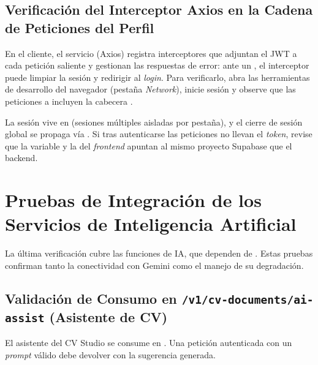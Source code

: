 \subsection[Verificación del Interceptor Axios]{Verificación del Interceptor Axios en la Cadena de Peticiones del Perfil}%
\label{subsec:axios}

En el cliente, el servicio  (Axios) registra interceptores que adjuntan
el JWT a cada petición saliente y gestionan las respuestas de error: ante un ,
el interceptor puede limpiar la sesión y redirigir al \textit{login}. Para verificarlo,
abra las herramientas de desarrollo del navegador (pestaña \textit{Network}), inicie sesión
y observe que las peticiones a  incluyen la cabecera .\par

\begin{NotaConfiguracion}
La sesión vive en  (sesiones múltiples aisladas por pestaña), y el
cierre de sesión global se propaga vía . Si tras autenticarse las
peticiones no llevan el \textit{token}, revise que la variable 
y la  del \textit{frontend} apuntan al mismo proyecto Supabase que el
backend.
\end{NotaConfiguracion}

\section{Pruebas de Integración de los Servicios de Inteligencia Artificial}%
\label{sec:ia}

La última verificación cubre las funciones de IA, que dependen de .
Estas pruebas confirman tanto la conectividad con Gemini como el manejo de su degradación.\par

\subsection[Asistente de CV (ai-assist)]{Validación de Consumo en \texttt{/v1/cv-documents/ai-assist} (Asistente de CV)}%
\label{subsec:ai-cv}

El asistente del CV Studio se consume en . Una petición
autenticada con un \textit{prompt} válido debe devolver  con la sugerencia
generada.\par

